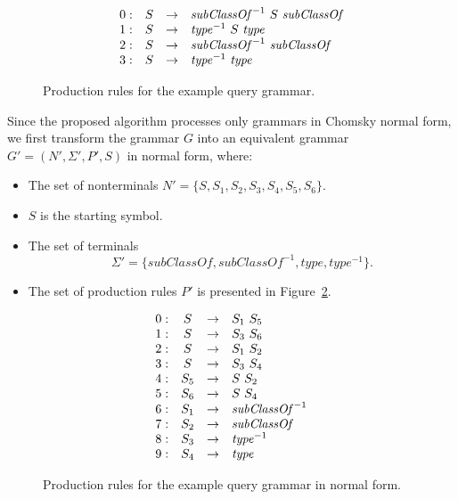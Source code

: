 \documentclass[runningheads,a4paper]{llncs}
\begin{document}
\begin{figure}[h]
	\[
	\begin{array}{rccl}
	0: & S & \rightarrow & \text{\textit{subClassOf}}^{-1} \ S \ \text{\textit{subClassOf}} \\ 
	1: & S & \rightarrow & \text{\textit{type}}^{-1} \ S \ \text{\textit{type}} \\ 
	2: & S & \rightarrow & \text{\textit{subClassOf}}^{-1} \ \text{\textit{subClassOf}} \\ 
	3: & S & \rightarrow & \text{\textit{type}}^{-1} \ \text{\textit{type}} \\ 
	\end{array}
	\]
	\caption{Production rules for the example query grammar.}
	\label{ProductionRulesExampleQuery}
\end{figure}

Since the proposed algorithm processes only grammars in Chomsky normal form, we first transform the grammar $G$ into an equivalent grammar $G' = (N', \Sigma', P', S)$ in normal form, where:
\begin{itemize}
	\item The set of nonterminals $N' = \{S, S_1, S_2, S_3, S_4, S_5, S_6\}$.
	\item $S$ is the starting symbol.
	\item The set of terminals $$\Sigma' = \{subClassOf, subClassOf^{-1}, type, type^{-1}\}.$$
	\item The set of production rules $P'$ is presented in Figure~\ref{ProductionRulesExampleQueryCNF}.
\end{itemize}

\begin{figure}[h]
	\[
	\begin{array}{rccl}
	0: & S & \rightarrow & S_1 \ S_5 \\
	1: & S & \rightarrow & S_3 \ S_6 \\
	2: & S & \rightarrow & S_1 \ S_2 \\
	3: & S & \rightarrow & S_3 \ S_4 \\
	4: & S_5 & \rightarrow & S \ S_2 \\
	5: & S_6 & \rightarrow & S \ S_4 \\
	6: & S_1 & \rightarrow & \text{\textit{subClassOf}}^{-1} \\ 
	7: & S_2 & \rightarrow & \text{\textit{subClassOf}} \\ 
	8: & S_3 & \rightarrow & \text{\textit{type}}^{-1} \\
	9: & S_4 & \rightarrow & \text{\textit{type}} \\ 
	\end{array}
	\]
	\caption{Production rules for the example query grammar in normal form.}
	\label{ProductionRulesExampleQueryCNF}
\end{figure}
\end{document}
